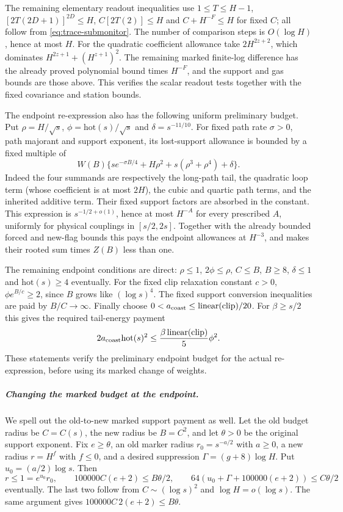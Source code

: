 The remaining elementary readout inequalities use
$1\le T\le H-1$, $[2T(2D+1)]^{2D}\le H$,
$C[2T(2)]\le H$ and $C+H^{-F}\le H$ for fixed $C$;
all follow from \eqref{eq:trace-submonitor}.
The number of comparison steps is $O(\log H)$, hence at most $H$.
For the quadratic coefficient allowance take
$2H^{2z+2}$, which dominates
$H^{2z+1}+(H^{z+1})^2$. The remaining marked finite-log difference
has the already proved polynomial bound times $H^{-F}$, and the
support and gas bounds are those above. This verifies the scalar
readout tests together with the fixed covariance and station bounds.

The endpoint re-expression also has the following uniform preliminary
budget. Put $\rho=H/\sqrt s$, $\phi=\mathrm{hot}(s)/\sqrt s$
and $\delta=s^{-11/10}$. For fixed path rate $\sigma>0$, path
majorant and support exponent, its lost-support allowance is bounded
by a fixed multiple of
\[
 W(B)\{s e^{-\sigma B/4}+H\rho^2
                       +s(\rho^3+\rho^4)+\delta\}.
\]
Indeed the four summands are respectively the long-path tail, the
quadratic loop term (whose coefficient is at most $2H$), the cubic
and quartic path terms, and the inherited additive term. Their fixed
support factors are absorbed in the constant. This expression is
$s^{-1/2+o(1)}$, hence at most $H^{-A}$ for every prescribed $A$,
uniformly for physical couplings in $[s/2,2s]$. Together with the
already bounded forced and new-flag bounds this pays the endpoint
allowances at $H^{-3}$, and makes their rooted sum times $Z(B)$
less than one.

The remaining endpoint conditions are direct: $\rho\le1$,
$2\phi\le\rho$, $C\le B$, $B\ge8$, $\delta\le1$ and
$\mathrm{hot}(s)\ge4$ eventually. For the fixed clip relaxation
constant $c>0$, $\phi e^{B/c}\ge2$, since $B$ grows like
$(\log s)^4$. The fixed support conversion inequalities are paid by
$B/C\to\infty$. Finally choose
$0<a_{\rm coast}\le\operatorname{linear}(\mathrm{clip})/20$.
For $\beta\ge s/2$ this gives the required tail-energy payment
\[
 2a_{\rm coast}\mathrm{hot}(s)^2
 \le\frac{\beta\operatorname{linear}(\mathrm{clip})}{5}\phi^2.
\]
These statements verify the preliminary endpoint budget for the
actual re-expression, before using its marked change of weights.

\subparagraph{Changing the marked budget at the endpoint.}
We spell out the old-to-new marked support payment as well. Let the
old budget radius be $C=C(s)$, the new radius be $B=C^2$, and let
$\theta>0$ be the original support exponent. Fix $e\ge\theta$,
an old marker radius $r_0=s^{-a/2}$ with $a\ge0$, a new radius
$r=H^f$ with $f\le0$, and a desired suppression
$\Gamma=(g+8)\log H$. Put $u_0=(a/2)\log s$. Then
\[
 r\le1=e^{u_0}r_0,\qquad
 100000C(e+2)\le B\theta/2,\qquad
 64(u_0+\Gamma+100000(e+2))\le C\theta/2
\]
eventually. The last two follow from $C\sim(\log s)^2$ and
$\log H=o(\log s)$. The same argument gives
$100000C\,2(e+2)\le B\theta$.

